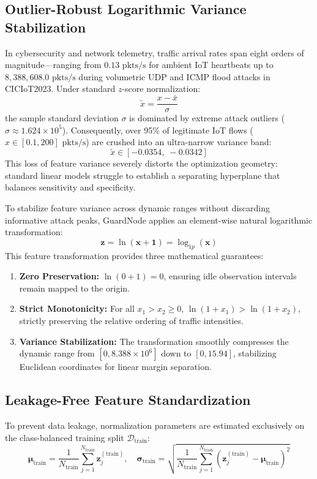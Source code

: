 \documentclass[conference]{IEEEtran}
\begin{document}
\subsection{Outlier-Robust Logarithmic Variance Stabilization}
In cybersecurity and network telemetry, traffic arrival rates span eight orders of magnitude---ranging from $0.13\text{ pkts/s}$ for ambient IoT heartbeats up to $8,388,608.0\text{ pkts/s}$ during volumetric UDP and ICMP flood attacks in CICIoT2023. Under standard $z$-score normalization:
\begin{equation}
\tilde{x} = \frac{x - \bar{x}}{\sigma}
\end{equation}
the sample standard deviation $\sigma$ is dominated by extreme attack outliers ($\sigma \approx 1.624 \times 10^5$). Consequently, over 95\% of legitimate IoT flows ($x \in [0.1, 200]\text{ pkts/s}$) are crushed into an ultra-narrow variance band:
\begin{equation}
\tilde{x} \in [-0.0354, \; -0.0342]
\end{equation}
This loss of feature variance severely distorts the optimization geometry: standard linear models struggle to establish a separating hyperplane that balances sensitivity and specificity.

To stabilize feature variance across dynamic ranges without discarding informative attack peaks, GuardNode applies an element-wise natural logarithmic transformation:
\begin{equation}
\mathbf{z} = \ln(\mathbf{x} + \mathbf{1}) = \log_{1p}(\mathbf{x})
\end{equation}
This feature transformation provides three mathematical guarantees:
\begin{enumerate}
    \item \textbf{Zero Preservation:} $\ln(0 + 1) = 0$, ensuring idle observation intervals remain mapped to the origin.
    \item \textbf{Strict Monotonicity:} For all $x_1 > x_2 \ge 0$, $\ln(1 + x_1) > \ln(1 + x_2)$, strictly preserving the relative ordering of traffic intensities.
    \item \textbf{Variance Stabilization:} The transformation smoothly compresses the dynamic range from $[0, 8.388 \times 10^6]$ down to $[0, 15.94]$, stabilizing Euclidean coordinates for linear margin separation.
\end{enumerate}

\subsection{Leakage-Free Feature Standardization}
To prevent data leakage, normalization parameters are estimated exclusively on the class-balanced training split $\mathcal{D}_{\text{train}}$:
\begin{equation}
\boldsymbol{\mu}_{\text{train}} = \frac{1}{N_{\text{train}}} \sum_{j=1}^{N_{\text{train}}} \mathbf{z}_j^{(\text{train})}, \quad \boldsymbol{\sigma}_{\text{train}} = \sqrt{\frac{1}{N_{\text{train}}} \sum_{j=1}^{N_{\text{train}}} (\mathbf{z}_j^{(\text{train})} - \boldsymbol{\mu}_{\text{train}})^2}
\end{equation}
\end{document}
